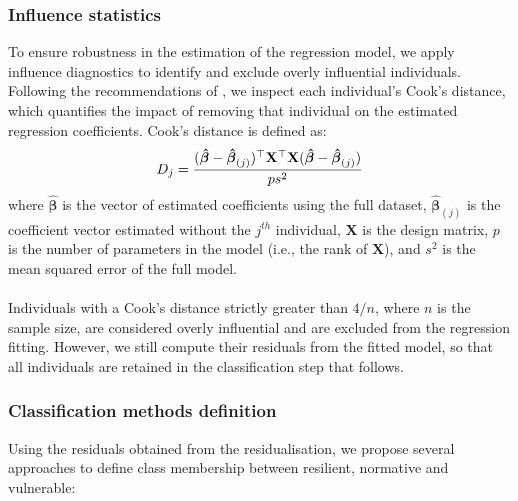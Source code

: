 \documentclass[12pt]{article}
\begin{document}
\subsubsection{Influence statistics}
To ensure robustness in the estimation of the regression model, we apply influence diagnostics to identify and exclude overly influential individuals. Following the recommendations of \cite{influencial_stat_residuals}, we inspect each individual's Cook's distance, which quantifies the impact of removing that individual on the estimated regression coefficients. Cook's distance is defined as:
\[
D_j = \frac{(\boldsymbol{\hat\beta} - \boldsymbol{\hat\beta}_{(j)})^\top \mathbf{X}^\top \mathbf{X} (\boldsymbol{\hat\beta} - \boldsymbol{\hat\beta}_{(j)})}{p s^2}\\
\]
where \( \boldsymbol{\hat\beta} \) is the vector of estimated coefficients using the full dataset, \( \boldsymbol{\hat\beta}_{(j)} \) is the coefficient vector estimated without the $j^{th}$ individual, \( \mathbf{X} \) is the design matrix, \( p \) is the number of parameters in the model (i.e., the rank of \( \mathbf{X} \)), and \( s^2 \) is the mean squared error of the full model.\\
\\
Individuals with a Cook’s distance strictly greater than \( 4/n \), where \( n \) is the sample size, are considered overly influential and are excluded from the regression fitting. However, we still compute their residuals from the fitted model, so that all individuals are retained in the classification step that follows. 

\subsubsection{Classification methods definition}
Using the residuals obtained from the residualisation, we propose several approaches to define class membership between resilient, normative and vulnerable:
\end{document}
